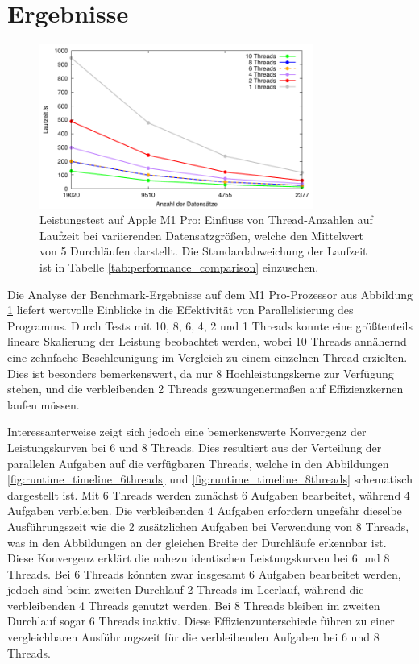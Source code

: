 \section{Ergebnisse}

\begin{figure}[H]
\centering
\includegraphics[width=0.8\textwidth]{../results/plots/m1pro/comp_all_threads.pdf}
\caption{Leistungstest auf Apple M1 Pro: Einfluss von Thread-Anzahlen auf Laufzeit bei variierenden Datensatzgrößen, welche den Mittelwert von 5 Durchläufen darstellt. Die Standardabweichung der Laufzeit ist in Tabelle \ref{tab:performance_comparison} einzusehen.}
\label{fig:m1pro_benchmark_threads}
\end{figure}

Die Analyse der Benchmark-Ergebnisse auf dem M1 Pro-Prozessor aus Abbildung \ref{fig:m1pro_benchmark_threads} liefert wertvolle Einblicke in die Effektivität von Parallelisierung des Programms. Durch Tests mit 10, 8, 6, 4, 2 und 1 Threads konnte eine größtenteils lineare Skalierung der Leistung beobachtet werden, wobei 10 Threads annähernd eine zehnfache Beschleunigung im Vergleich zu einem einzelnen Thread erzielten. Dies ist besonders bemerkenswert, da nur 8 Hochleistungskerne zur Verfügung stehen, und die verbleibenden 2 Threads gezwungenermaßen auf Effizienzkernen laufen müssen.

Interessanterweise zeigt sich jedoch eine bemerkenswerte Konvergenz der Leistungskurven bei 6 und 8 Threads. Dies resultiert aus der Verteilung der parallelen Aufgaben auf die verfügbaren Threads, welche in den Abbildungen \ref{fig:runtime_timeline_6threads} und \ref{fig:runtime_timeline_8threads} schematisch dargestellt ist. Mit 6 Threads werden zunächst 6 Aufgaben bearbeitet, während 4 Aufgaben verbleiben. Die verbleibenden 4 Aufgaben erfordern ungefähr dieselbe Ausführungszeit wie die 2 zusätzlichen Aufgaben bei Verwendung von 8 Threads, was in den Abbildungen an der gleichen Breite der Durchläufe erkennbar ist. Diese Konvergenz erklärt die nahezu identischen Leistungskurven bei 6 und 8 Threads.
Bei 6 Threads könnten zwar insgesamt 6 Aufgaben bearbeitet werden, jedoch sind beim zweiten Durchlauf 2 Threads im Leerlauf, während die verbleibenden 4 Threads genutzt werden. Bei 8 Threads bleiben im zweiten Durchlauf sogar 6 Threads inaktiv. Diese Effizienzunterschiede führen zu einer vergleichbaren Ausführungszeit für die verbleibenden Aufgaben bei 6 und 8 Threads.

